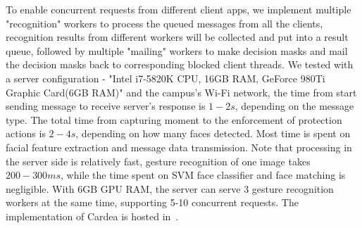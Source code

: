 \begin{description}[leftmargin=0cm]
  \item[{Concurrent requests:}] To enable concurrent requests from different client apps, we implement multiple "recognition" workers to process the queued messages from all the clients, recognition results from different workers will be collected and put into a result queue, followed by multiple "mailing" workers to make decision masks and mail the decision masks back to corresponding blocked client threads. We tested with a server configuration - "Intel i7-5820K CPU, 16GB RAM, GeForce 980Ti Graphic Card(6GB RAM)" and the campus's Wi-Fi network, the time from start sending message to receive server's response is $1-2s$, depending on the message type. The total time from capturing moment to the enforcement of protection actions is $2-4s$, depending on how many faces detected. Most time is spent on facial feature extraction and message data transmission. Note that processing in the server side is relatively fast, gesture recognition of one image takes $200-300ms$, while the time spent on SVM face classifier and face matching is negligible. With 6GB GPU RAM, the server can serve 3 gesture recognition workers at the same time, supporting 5-10 concurrent requests. The implementation of Cardea is hosted in~\cite{links:cardeaproj}.

\end{description}


\newpage
